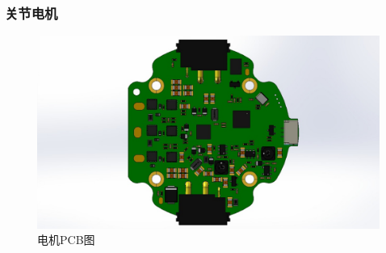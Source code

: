 \documentclass{beamer}
\begin{document}
	\begin{frame}
		\frametitle{关节电机}
		\begin{figure}
			\centering
			\includegraphics[width=\linewidth]{img/chapter4/motor}
			\captionsetup{font=scriptsize}
			
			\caption{电机PCB图}
		\end{figure}
	\end{frame}
	
\end{document}

